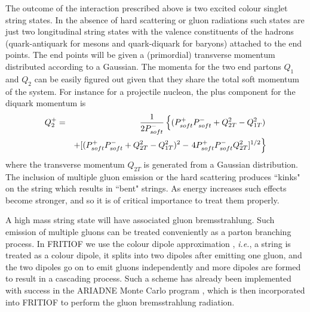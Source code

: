 The outcome of the interaction prescribed above is two
excited colour singlet string states.  In the absence of hard scattering or 
gluon radiations such states are just two longitudinal string states
with the valence constituents of the hadrons (quark-antiquark for mesons and 
quark-diquark for baryons) attached to the end points.  The end points
will be given a (primordial) transverse momentum distributed according to
a Gaussian.  The momenta for the two end partons $Q_1$ and $Q_2$ can be easily 
figured out given that they share the total soft momentum of the system.
For instance for a projectile nucleon, the plus component for the diquark
momentum is 
\begin{eqnarray}
\label{q1q2}
Q_2^+ &=&{1\over{2P^-_{soft}}} 
\left\{ ( P^+_{soft}P^-_{soft} + Q^2_{2T} -Q^2_{1T}) \right. \nonumber \\  
  & & +[ (P^+_{soft}P^-_{soft} + Q^2_{2T} -Q^2_{1T})^2           
  - \left. 4P^+_{soft}P^-_{soft}Q^2_{2T} ]^{1/2} \right\} 
\end{eqnarray}
where the transverse momentum $Q_{2T}$ is generated from a
Gaussian distribution.  
The inclusion of
multiple gluon emission or the hard scattering produces ``kinks" on the
string which results in ``bent" strings.  As energy increases such effects
become stronger, and so it is of critical importance to treat them properly.

A high mass string state will have associated gluon bremsstrahlung.  Such 
emission of multiple gluons can be treated conveniently as a parton
branching process. In FRITIOF we use 
the colour dipole approximation \cite{dipol}, 
{\it i.e.}, a string is treated as a colour
dipole, it splits into two dipoles after emitting one gluon, and the two
dipoles go on to emit gluons independently and more dipoles are formed
to result in a cascading process.  Such a scheme has already been 
implemented with success
in the ARIADNE Monte Carlo program \cite{aria}, 
which is then incorporated into FRITIOF
to perform the gluon bremsstrahlung radiation.

